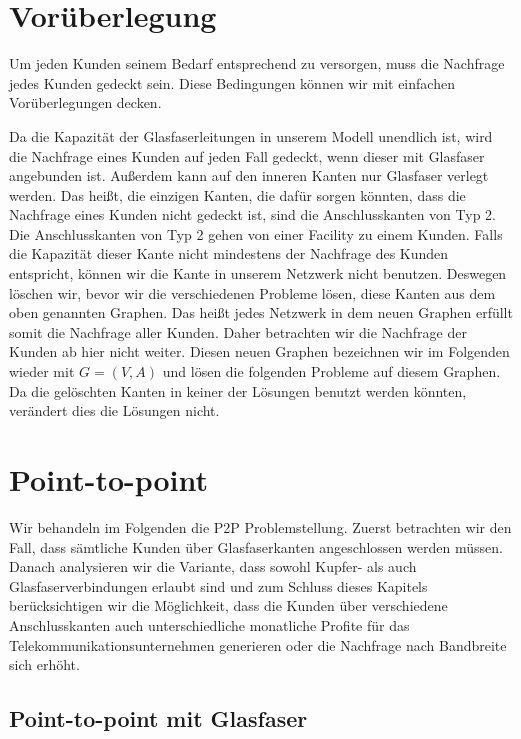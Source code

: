 \documentclass[11pt,a4paper]{article}
\theoremstyle{my_th_style1}
\begin{document}
\section{Vorüberlegung}
\label{preprocess}

Um jeden Kunden seinem Bedarf entsprechend zu versorgen, muss die Nachfrage jedes Kunden gedeckt sein.
Diese Bedingungen k\"onnen wir mit einfachen Vor\"uberlegungen decken.

Da die Kapazität der Glasfaserleitungen in unserem Modell unendlich ist, wird die Nachfrage eines Kunden auf jeden Fall gedeckt, wenn dieser mit Glasfaser angebunden ist.
Außerdem kann auf den inneren Kanten nur Glasfaser verlegt werden.
Das heißt, die einzigen Kanten, die dafür sorgen könnten, dass die Nachfrage eines Kunden nicht gedeckt ist, sind die Anschlusskanten von Typ 2.
Die Anschlusskanten von Typ 2 gehen von einer Facility zu einem Kunden.
Falls die Kapazit\"at dieser Kante nicht mindestens der Nachfrage des Kunden entspricht, können wir die Kante in unserem Netzwerk nicht benutzen. 
Deswegen löschen wir, bevor wir die verschiedenen Probleme lösen, diese Kanten aus dem oben genannten Graphen.
Das heißt jedes Netzwerk in dem neuen Graphen erfüllt somit die Nachfrage aller Kunden.
Daher betrachten wir die Nachfrage der Kunden ab hier nicht weiter.
Diesen neuen Graphen bezeichnen wir im Folgenden wieder mit $G=(V,A)$ und lösen die folgenden Probleme auf diesem Graphen.
Da die gelöschten Kanten in keiner der Lösungen benutzt werden könnten, verändert dies die Lösungen nicht.

\section{Point-to-point}

Wir behandeln im Folgenden die P2P Problemstellung.
Zuerst betrachten wir den Fall, dass s\"amtliche Kunden \"uber Glasfaserkanten angeschlossen werden m\"ussen.
Danach analysieren wir die Variante, dass sowohl Kupfer- als auch Glasfaserverbindungen erlaubt sind und zum Schluss dieses Kapitels ber\"ucksichtigen wir die M\"oglichkeit, dass die Kunden \"uber verschiedene Anschlusskanten auch unterschiedliche monatliche Profite f\"ur das Telekommunikationsunternehmen generieren oder die Nachfrage nach Bandbreite sich erh\"oht.

\subsection{Point-to-point mit Glasfaser}
\end{document}
